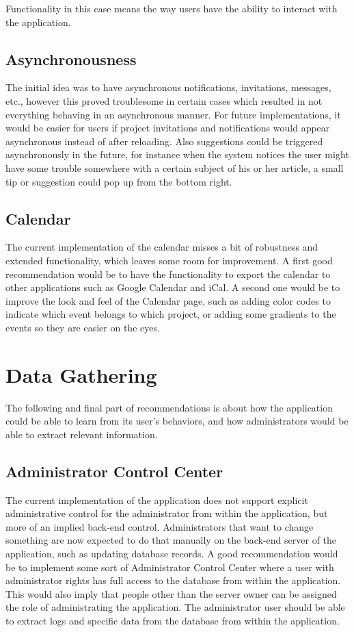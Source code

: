 Functionality in this case means the way users have the ability to interact with the application.

\subsection{Asynchronousness}

The initial idea was to have asynchronous notifications, invitations, messages, etc., however this proved troublesome in certain
cases which resulted in not everything behaving in an asynchronous manner. For future implementations, it would be easier for users
if project invitations and notifications would appear asynchronous instead of after reloading. Also suggestions could be
triggered asynchronously in the future, for instance when the system notices the user might have some trouble somewhere with
a certain subject of his or her article, a small tip or suggestion could pop up from the bottom right.

\subsection{Calendar}

The current implementation of the calendar misses a bit of robustness and extended functionality, which leaves some room for
improvement. A first good recommendation would be to have the functionality to export the calendar to other applications such as
Google Calendar and iCal. A second one would be to improve the look and feel of the Calendar page, such as adding color codes to
indicate which event belongs to which project, or adding some gradients to the events so they are easier on the eyes.

\section{Data Gathering}

The following and final part of recommendations is about how the application could be able to learn from its user's behaviors,
and how administrators would be able to extract relevant information.

\subsection{Administrator Control Center}

The current implementation of the application does not support explicit administrative control for the administrator from within the application, 
but more of an implied back-end control. Administrators that want to change something are now expected to do that manually on the back-end
server of the application, such as updating database records. 
A good recommendation would be to implement some sort of Administrator Control Center where a user with administrator rights
has full access to the database from within the application. This would also imply that people other than the server owner can
be assigned the role of administrating the application. The administrator user should be able to extract logs and specific
data from the database from within the application.

